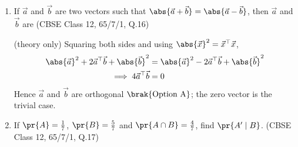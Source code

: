 \begin{enumerate}[label=\thesubsection.\arabic*, ref=\thesubsection.\theenumi]
\solution
Let $u = \frac{e^x}{2}$, so $du = \frac{e^x}{2}\,dx$ and $4 - e^{2x} = 4\brak{1 - u^2}$. Then
\begin{align}
	\int \frac{e^x\,dx}{\sqrt{4-e^{2x}}} = \int \frac{2\,du}{2\sqrt{1-u^2}} = \sin^{-1}u + C = \sin^{-1}\brak{\frac{e^x}{2}} + C \quad \brak{\text{Option D}}
\end{align}
valid for $e^{2x} < 4$, i.e.\ $x < \ln 2$. To check this, apply the trapezoidal rule over $\sbrak{-1, 0}$ and compare with $F\brak{0} - F\brak{-1} = \frac{\pi}{6} - \sin^{-1}\brak{\frac{e^{-1}}{2}} \approx 0.33861$; the rule gives $T_4 = 0.34158$ and $T_{40} = 0.33864$. The following code verifies the solution
\begin{lstlisting}[frame=single, basicstyle=\rmfamily, escapeinside={(*@}{@*)}]
(*@\makebox[\dimexpr\linewidth-2\fboxsep-2\fboxrule\relax][c]{codes/14.py}@*)
\end{lstlisting}

\item
If $\vec{a}$ and $\vec{b}$ are two vectors such that $\abs{\vec{a}+\vec{b}} = \abs{\vec{a}-\vec{b}}$, then $\vec{a}$ and $\vec{b}$ are
\hfill (CBSE Class 12, 65/7/1, Q.16)

\solution
(theory only) Squaring both sides and using $\abs{\vec{x}}^2 = \vec{x}^{\top}\vec{x}$,
\begin{align}
	\abs{\vec{a}}^2 + 2\vec{a}^{\top}\vec{b} + \abs{\vec{b}}^2 &= \abs{\vec{a}}^2 - 2\vec{a}^{\top}\vec{b} + \abs{\vec{b}}^2
	\\
	\implies 4\vec{a}^{\top}\vec{b} &= 0
\end{align}
Hence $\vec{a}$ and $\vec{b}$ are orthogonal $\brak{\text{Option A}}$; the zero vector is the trivial case.

\item
If $\pr{A} = \frac{1}{7}$, $\pr{B} = \frac{5}{7}$ and $\pr{A \cap B} = \frac{4}{7}$, find $\pr{A^{\prime} \mid B}$.
\hfill (CBSE Class 12, 65/7/1, Q.17)


\end{enumerate}
